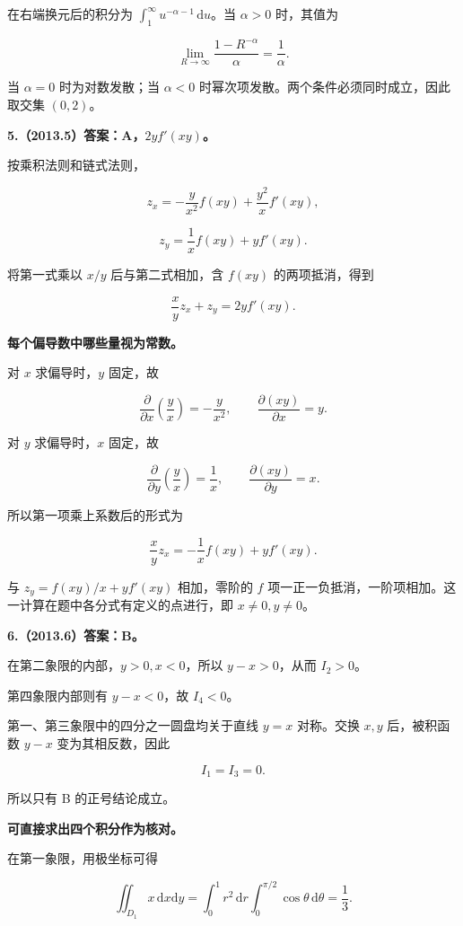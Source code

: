 \documentclass[UTF8,11pt,fontset=windows]{ctexart}
\begin{document}
在右端换元后的积分为 $\int_1^\infty u^{-\alpha-1}\,\mathrm du$。当 $\alpha>0$ 时，其值为

$$
\lim_{R\to\infty}\frac{1-R^{-\alpha}}\alpha=\frac1\alpha.
$$

当 $\alpha=0$ 时为对数发散；当 $\alpha<0$ 时幂次项发散。两个条件必须同时成立，因此取交集 $(0,2)$。

\clearpage

\textbf{5.（2013.5）答案：A，$2yf'(xy)$。}

按乘积法则和链式法则，

$$
z_x=-\frac{y}{x^2}f(xy)+\frac{y^2}{x}f'(xy),
$$

$$
z_y=\frac1x f(xy)+y f'(xy).
$$

将第一式乘以 $x/y$ 后与第二式相加，含 $f(xy)$ 的两项抵消，得到

$$
\frac xy z_x+z_y=2yf'(xy).
$$

\textbf{每个偏导数中哪些量视为常数。}

对 $x$ 求偏导时，$y$ 固定，故

$$
\frac{\partial}{\partial x}\left(\frac yx\right)=-\frac y{x^2},
\qquad \frac{\partial(xy)}{\partial x}=y.
$$

对 $y$ 求偏导时，$x$ 固定，故

$$
\frac{\partial}{\partial y}\left(\frac yx\right)=\frac1x,
\qquad \frac{\partial(xy)}{\partial y}=x.
$$

所以第一项乘上系数后的形式为

$$
\frac xy z_x=-\frac1x f(xy)+y f'(xy).
$$

与 $z_y=f(xy)/x+yf'(xy)$ 相加，零阶的 $f$ 项一正一负抵消，一阶项相加。这一计算在题中各分式有定义的点进行，即 $x\ne0,y\ne0$。

\clearpage

\textbf{6.（2013.6）答案：B。}

在第二象限的内部，$y>0,x<0$，所以 $y-x>0$，从而 $I_2>0$。

第四象限内部则有 $y-x<0$，故 $I_4<0$。

第一、第三象限中的四分之一圆盘均关于直线 $y=x$ 对称。交换 $x,y$ 后，被积函数 $y-x$ 变为其相反数，因此

$$
I_1=I_3=0.
$$

所以只有 B 的正号结论成立。

\textbf{可直接求出四个积分作为核对。}

在第一象限，用极坐标可得

$$
\iint_{D_1}x\,\mathrm dx\mathrm dy
=\int_0^1r^2\,\mathrm dr\int_0^{\pi/2}\cos\theta\,\mathrm d\theta
=\frac13.
$$
\end{document}
